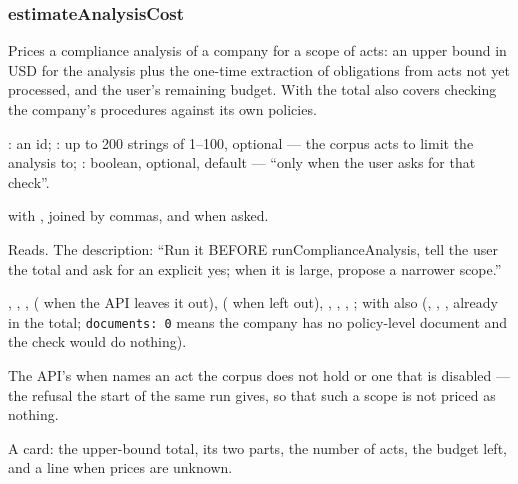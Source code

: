 \subsubsection{estimateAnalysisCost}\label{sec:tools:estimateAnalysisCost}
\begin{description}[style=multiline, leftmargin=19mm, labelwidth=17mm, labelsep=2mm,
  font=\sffamily\bfseries\footnotesize\color{ink}, itemsep=1pt, topsep=2pt, before=\raggedright]
  \item[Does] Prices a compliance analysis of a company for a scope of acts: an upper bound
    in USD for the analysis plus the one-time extraction of obligations from acts not yet
    processed, and the user's remaining budget. With  the total also
    covers checking the company's procedures against its own policies.
  \item[Input] : an id; : up to 200 strings of 1--100,
    optional --- the corpus acts to limit the analysis to; :
    boolean, optional, default  --- \enquote{only when the user asks for that
    check}.
  \item[Calls]  with , 
    joined by commas, and  when asked.
  \item[Kind] Reads. The description: \enquote{Run it BEFORE runComplianceAnalysis, tell the
    user the total and ask for an explicit yes; when it is large, propose a narrower scope.}
  \item[Returns] , , ,
     ( when the API leaves it out), 
    ( when left out), , , ,
    ; with  also 
    (, , , already in the total; \texttt{documents: 0} means the company has no policy-level document and the check would do nothing).
  \item[Errors] The API's  when  names an act the corpus
    does not hold or one that is disabled --- the refusal the start of the same run gives, so
    that such a scope is not priced as nothing.
  \item[Console] A card: the upper-bound total, its two parts, the number of acts, the budget
    left, and a line when prices are unknown.
\end{description}


